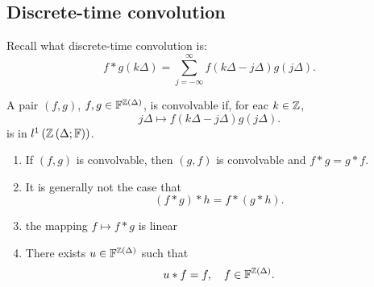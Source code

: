 \subsection{Discrete-time convolution}
Recall what discrete-time convolution is:
\[
	f * g \left( k\Delta \right) = \sum_{j = -\infty}^{\infty} f \left( k \Delta - j \Delta \right) g \left( j \Delta \right) 
.\] 
\begin{definition}
	A pair $\left( f, g \right) $, $f, g \in  \mathbb{F}^{\mathbb{Z}\left( \Delta \right) }$, is convolvable if, for eac $k \in \mathbb{Z}$, 
	\[
		j \Delta \longmapsto f \left( k \Delta - j \Delta \right) g \left( j \Delta \right) 
	.\] 
	is in $l^{1}\left( \mathbb{Z} \left( \Delta; \mathbb{F} \right)  \right) $. 
\end{definition}
\begin{property}
	\begin{enumerate}
		\item If $\left( f, g \right) $ is convolvable, then $\left( g, f \right) $ is convolvable and $f * g = g * f$.
		\item It is generally not the case that 
			\[
				\left( f * g \right)  * h = f * \left(  g * h \right) 
			.\] 
		\item the mapping $f \longmapsto f * g$ is linear 
		\item There exists $u \in  \mathbb{F}^{\mathbb{Z}\left( \Delta \right) }$ such that 
			\[
				u * f = f , \quad f \in  \mathbb{F}^{\mathbb{Z}\left( \Delta \right) }
			.\] 
	\end{enumerate}	
\end{property}

